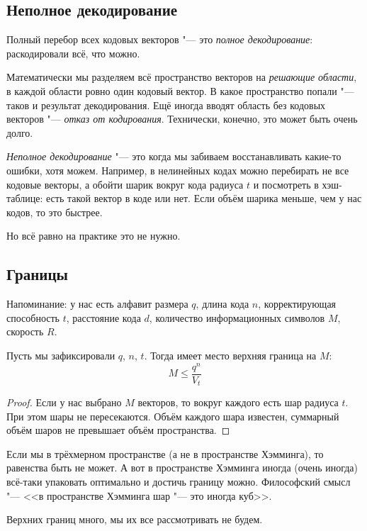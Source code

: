 \subsection{Неполное декодирование}
Полный перебор всех кодовых векторов "--- это \textit{полное декодирование}:
раскодировали всё, что можно.

Математически мы разделяем всё пространство векторов на \textit{решающие области},
в каждой области ровно один кодовый вектор.
В какое пространство попали "--- таков и результат декодирования.
Ещё иногда вводят область без кодовых векторов "--- \textit{отказ от кодирования}.
Технически, конечно, это может быть очень долго.

\textit{Неполное декодирование} "--- это когда мы забиваем восстанавливать
какие-то ошибки, хотя можем.
Например, в нелинейных кодах можно перебирать не все кодовые векторы,
а обойти шарик вокруг кода радиуса $t$ и посмотреть в хэш-таблице:
есть такой вектор в коде или нет.
Если объём шарика меньше, чем у нас кодов, то это быстрее.

Но всё равно на практике это не нужно.

\subsection{Границы}
Напоминание: у нас есть алфавит размера $q$, длина кода $n$,
корректирующая способность $t$, расстояние кода $d$,
количество информационных символов $M$, скорость $R$.

\begin{lemma}
Пусть мы зафиксировали $q$, $n$, $t$.
Тогда имеет место верхняя граница на $M$:
\[
	M \le \frac{q^n}{V_t}
\]
\end{lemma}
\begin{proof}
	Если у нас выбрано $M$ векторов, то вокруг каждого
	есть шар радиуса $t$.
	При этом шары не пересекаются.
	Объём каждого шара известен, суммарный объём шаров
	не превышает объём пространства.
\end{proof}

\begin{Rem}
	Если мы в трёхмерном пространстве (а не в пространстве Хэмминга),
	то равенства быть не может.
	А вот в пространстве Хэмминга иногда (очень иногда) всё-таки
	упаковать оптимально и достичь границу можно.
	Философский смысл "--- <<в пространстве Хэмминга шар "--- это иногда куб>>.
\end{Rem}
\begin{Rem}
	Верхних границ много, мы их все рассмотривать не будем.
\end{Rem}

